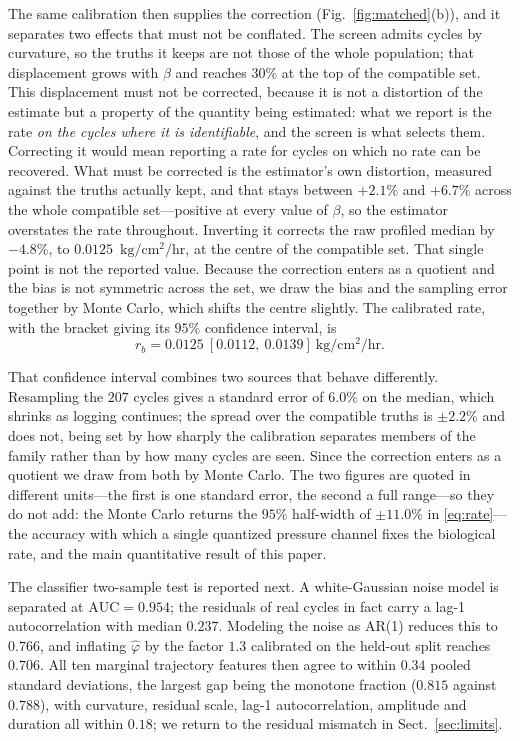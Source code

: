 \documentclass[sigconf]{acmart}
\newcommand{\ratu}{\ensuremath{\mathrm{kg/cm^{2}/hr}}}
\newcommand{\rb}{\ensuremath{r_{b}}}
\begin{document}
The same calibration then supplies the correction
(Fig.~\ref{fig:matched}(b)), and it separates two effects that must not
be conflated. The screen admits cycles by curvature, so the truths it
keeps are not those of the whole population; that displacement grows
with $\beta$ and reaches $30\%$ at the top of the compatible set. This
displacement must not be corrected, because it is not a distortion of
the estimate but a property of the quantity being estimated: what we
report is the rate \emph{on the cycles where it is identifiable}, and
the screen is what selects them. Correcting it would mean reporting a
rate for cycles on which no rate can be recovered. What must be
corrected is the estimator's own distortion, measured against
the truths actually kept, and that stays between $+2.1\%$ and
$+6.7\%$ across the whole compatible set---positive at every value of
$\beta$, so the estimator overstates the rate throughout. Inverting it corrects the raw
profiled median by $-4.8\%$, to $0.0125$~\ratu{}, at the centre of the
compatible set. That single point is not the reported value. Because
the correction enters as a quotient and the bias is not symmetric
across the set, we draw the bias and the sampling error together by
Monte Carlo, which shifts the centre slightly. The calibrated rate,
with the bracket giving its $95\%$ confidence interval, is
\begin{equation}
\rb = 0.0125\ [0.0112,\ 0.0139]~\ratu{} .
\label{eq:rate}
\end{equation}

That confidence interval combines two sources that behave differently. Resampling
the $207$ cycles gives a standard error of $6.0\%$ on the median, which
shrinks as logging continues; the spread over the compatible truths is
$\pm 2.2\%$ and does not, being set by how sharply the calibration
separates members of the family rather than by how many cycles are
seen. Since the correction enters as a quotient we draw from both by
Monte Carlo. The two figures are quoted in different units---the first
is one standard error, the second a full range---so they do not add:
the Monte Carlo returns the $95\%$ half-width of $\pm 11.0\%$ in
\eqref{eq:rate}---the accuracy
with which a single quantized pressure channel fixes the biological
rate, and the main quantitative result of this paper.

The classifier two-sample test is reported next. A
white-Gaussian noise model is separated at $\mathrm{AUC}=0.954$; the
residuals of real cycles in fact carry a lag-1 autocorrelation with
median $0.237$. Modeling the noise as AR(1) reduces this to $0.766$,
and inflating $\hat{\varphi}$ by the factor $1.3$ calibrated on the
held-out split reaches $0.706$. All ten marginal trajectory features
then agree to within $0.34$ pooled standard deviations, the largest gap
being the monotone fraction ($0.815$ against $0.788$), with curvature,
residual scale, lag-1 autocorrelation, amplitude and duration all
within $0.18$; we return to the residual mismatch in
Sect.~\ref{sec:limits}.
\end{document}
